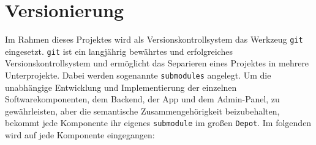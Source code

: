 \section{Versionierung}

Im Rahmen dieses Projektes wird als Versionskontrollsystem das Werkzeug \verb#git# eingesetzt.
\verb#git# ist ein langjährig bewährtes und erfolgreiches Versionskontrollsystem und ermöglicht das Separieren eines Projektes in mehrere Unterprojekte.
Dabei werden sogenannte \verb#submodules# angelegt.
Um die unabhängige Entwicklung und Implementierung der einzelnen Softwarekomponenten, dem Backend, der App und dem Admin-Panel, zu gewährleisten, aber die semantische Zusammengehörigkeit beizubehalten,
bekommt jede Komponente ihr eigenes \verb#submodule# im großen \verb#Depot#.
Im folgenden wird auf jede Komponente eingegangen: